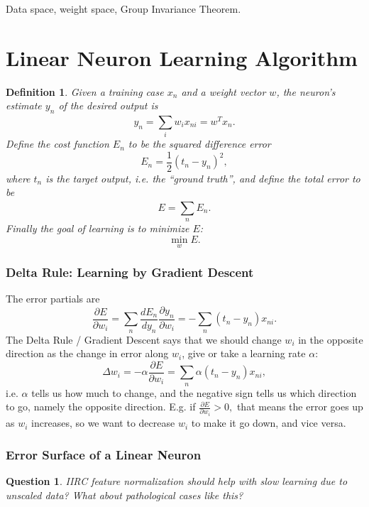 \documentclass[12pt]{article}
\theoremstyle{plain}
\newtheorem{question}[theorem]{Question}
\newtheorem{definition}[theorem]{Definition}
\theoremstyle{definition}
\theoremstyle{remark}
\begin{document}
Data space, weight space, Group Invariance Theorem.

\part{Linear Neuron Learning Algorithm}

\begin{definition}
Given a training case $x_n$ and a weight vector $w$, the neuron's estimate $y_n$ of the desired output is $$y_n = \sum_{i}^{} w_i x_{ni} = w^T x_n.$$ Define the cost function $E_n$ to be the squared difference error $$E_n = \frac{1}{2}(t_n - y_n)^2,$$ where $t_n$ is the target output, i.e. the ``ground truth'', and define the total error to be $$E = \sum_{n}^{} E_n.$$ Finally the goal of learning is to minimize $E$: $$\min_{w} E.$$
\end{definition}

\section{Delta Rule: Learning by Gradient Descent}

The error partials are 
$$\frac{\partial E}{\partial w_i} = \sum_n \frac{dE_n}{dy_n} \frac{\partial y_n}{\partial w_i} = - \sum_n (t_n - y_n) x_{ni}.$$
The Delta Rule / Gradient Descent says that we should change $w_i$ in the opposite direction as the change in error along $w_i$, give or take a learning rate $\alpha$:
$$\Delta w_i = - \alpha \frac{\partial E}{\partial w_i} = \sum_n \alpha (t_n - y_n) x_{ni},$$ i.e. $\alpha$ tells us how much to change, and the negative sign tells us which direction to go, namely the opposite direction. E.g. if $\frac{\partial E}{\partial w_i} > 0,$ that means the error goes up as $w_i$ increases, so we want to decrease $w_i$ to make it go down, and vice versa.

\section{Error Surface of a Linear Neuron}

\begin{question}
IIRC feature normalization should help with slow learning due to unscaled data? What about pathological cases like this?
\end{question}
\end{document}
